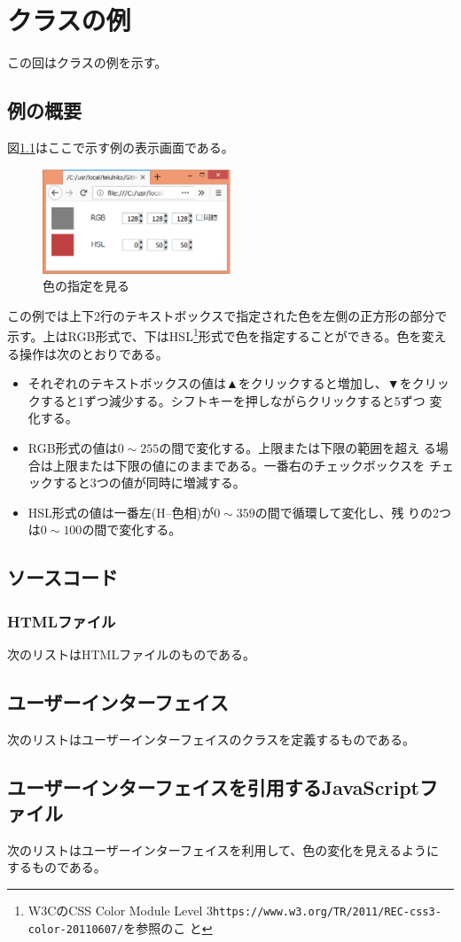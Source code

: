 \chapter{クラスの例}
この回はクラスの例を示す。
\section{例の概要}
図\ref{color}はここで示す例の表示画面である。
\begin{figure}[ht]
 \begin{center}
  \includegraphics[width=0.5\textwidth]{13Ex.eps}
 \end{center}
 \caption{色の指定を見る}\label{color}
\end{figure}
この例では上下2行のテキストボックスで指定された色を左側の正方形の部分で
示す。上はRGB形式で、下はHSL\footnote{W3CのCSS Color Module Level
3\texttt{https://www.w3.org/TR/2011/REC-css3-color-20110607/}を参照のこ
と}形式で色を指定することができる。色を変える操作は次のとおりである。
\begin{itemize}
 \item それぞれのテキストボックスの値は▲をクリックすると増加し、▼をクリッ
       クすると1ずつ減少する。シフトキーを押しながらクリックすると5ずつ
       変化する。
 \item RGB形式の値は$0\sim255$の間で変化する。上限または下限の範囲を超え
       る場合は上限または下限の値にのままである。一番右のチェックボックスを
       チェックすると3つの値が同時に増減する。
 \item HSL形式の値は一番左(H--色相)が$0\sim359$の間で循環して変化し、残
       りの2つは$0\sim100$の間で変化する。
\end{itemize}
\section{ソースコード}
\subsection{HTMLファイル}
次のリストはHTMLファイルのものである。
 \section{ユーザーインターフェイス}
 次のリストはユーザーインターフェイスのクラスを定義するものである。
 \section{ユーザーインターフェイスを引用するJavaScriptファイル}
 次のリストはユーザーインターフェイスを利用して、色の変化を見えるように
 するものである。
 